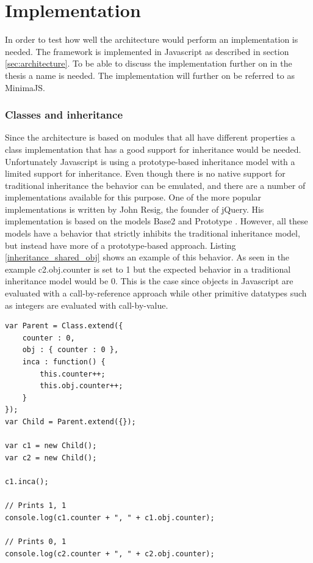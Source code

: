 \chapter{Implementation}

\setcounter{section}{5}
\setcounter{subsection}{0}

In order to test how well the architecture would perform an implementation is needed. The framework is implemented in Javascript as described in section \ref{sec:architecture}. To be able to discuss the implementation further on in the thesis a name is needed. The implementation will further on be referred to as MinimaJS.

\subsection{Classes and inheritance}

Since the architecture is based on modules that all have different properties a class implementation that has a good support for inheritance would be needed. Unfortunately Javascript is using a prototype-based inheritance model with a limited support for inheritance. Even though there is no native support for traditional inheritance the behavior can be emulated, and there are a number of implementations available for this purpose. One of the more popular implementations is written by John Resig, the founder of jQuery. His implementation is based on the models Base2 and Prototype \cite{john_resig_model}. However, all these models have a behavior that strictly inhibits the traditional inheritance model, but instead have more of a prototype-based approach. Listing \ref{inheritance_shared_obj} shows an example of this behavior. As seen in the example c2.obj.counter is set to 1 but the expected behavior in a traditional inheritance model would be 0. This is the case since objects in Javascript are evaluated with a call-by-reference approach while other primitive datatypes such as integers are evaluated with call-by-value.

\lstset{frame=single, caption=Inheritance using John Resig's inheritance model with shared objects between instances, label=inheritance_shared_obj, captionpos=b, tabsize=2}
\begin{framed}
\begin{lstlisting}
var Parent = Class.extend({
	counter : 0,
	obj : { counter : 0 },
	inca : function() {
		this.counter++;
		this.obj.counter++;
	}
});
var Child = Parent.extend({});

var c1 = new Child();
var c2 = new Child();

c1.inca();

// Prints 1, 1
console.log(c1.counter + ", " + c1.obj.counter);

// Prints 0, 1
console.log(c2.counter + ", " + c2.obj.counter); 
\end{lstlisting}
\end{framed}

